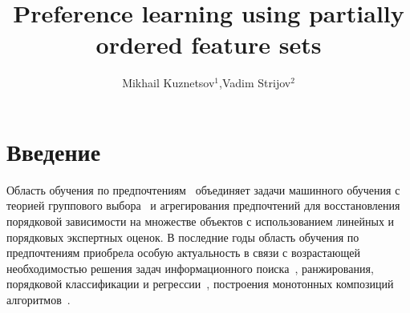 \documentclass{elsarticle}
\begin{document}
\begin{frontmatter}



\title{Preference learning using partially ordered feature sets}


\author{Mikhail Kuznetsov$^1$,Vadim Strijov$^2$}

\address{}

\begin{abstract}

\end{abstract}

\begin{keyword}



\end{keyword}

\end{frontmatter}

\section{Введение}

Область обучения по предпочтениям~\cite{Fuernkranz2011} объединяет задачи машинного обучения с теорией группового выбора~\cite{kendall1938new, arrow19511963, kemeny1959mathematics} и агрегирования предпочтений для восстановления порядковой зависимости на множестве объектов с использованием линейных и порядковых экспертных оценок. В последние годы область обучения по предпочтениям приобрела особую актуальность в связи с возрастающей необходимостью решения задач информационного поиска~\cite{liu2009learning}, ранжирования, порядковой классификации и регрессии~\cite{mccullagh1980regression,herbrich1999large}, построения монотонных композиций алгоритмов~\cite{vorontsov1999local, hang2011short}.
\end{document}
